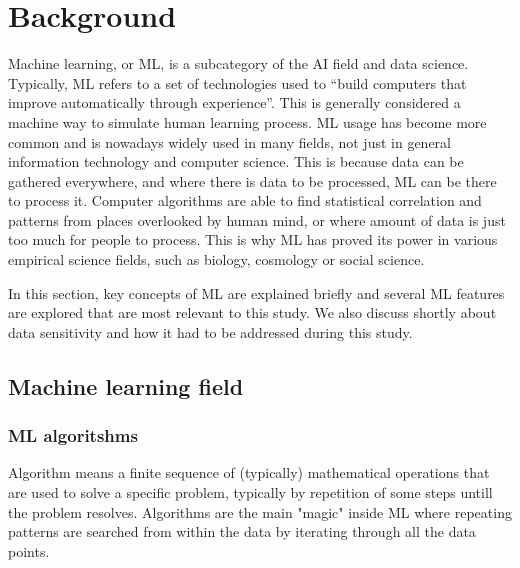 
\section{Background}\label{sec:background}


Machine learning, or ML,
is a subcategory of the AI field and data science.
Typically, ML refers to
a set of technologies used to \enquote{build computers
that improve automatically through experience}.\cite{jordan2015machine}
This is generally considered a machine way
to simulate human learning process.
ML usage has become more common
and is nowadays widely used in many fields,
not just in general information technology and computer science.
This is because data can be gathered everywhere,
and where there is data to be processed,
ML can be there to process it.
Computer algorithms are able to find 
statistical correlation and patterns
from places overlooked by human mind,
or where amount of data is just too much 
for people to process.
This is why ML has proved its power
in various empirical science fields,
such as biology, cosmology or social science.\cite{jordan2015machine}

In this section, 
key concepts of ML are explained briefly
and several ML features are explored 
that are most relevant to this study.
We also discuss shortly about data sensitivity
and how it had to be addressed during this study.

\subsection{Machine learning field}\label{subsec:bg-ml-field}

\subsubsection*{ML algoritshms}
Algorithm means a finite sequence of (typically) mathematical operations
that are used to solve a specific problem, 
typically by repetition of some steps
untill the problem resolves.\cite{merriam2022algorithm}
Algorithms are the main "magic" inside ML
where repeating patterns are searched from within the data
by iterating through all the data points.

